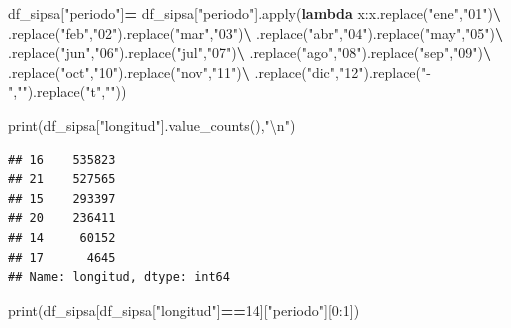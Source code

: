 \documentclass[
]{book}
\newenvironment{Shaded}{\begin{snugshade}}{\end{snugshade}}
\newcommand{\BuiltInTok}[1]{#1}
\newcommand{\CharTok}[1]{\textcolor[rgb]{0.31,0.60,0.02}{#1}}
\newcommand{\DecValTok}[1]{\textcolor[rgb]{0.00,0.00,0.81}{#1}}
\newcommand{\KeywordTok}[1]{\textcolor[rgb]{0.13,0.29,0.53}{\textbf{#1}}}
\newcommand{\NormalTok}[1]{#1}
\newcommand{\OperatorTok}[1]{\textcolor[rgb]{0.81,0.36,0.00}{\textbf{#1}}}
\newcommand{\StringTok}[1]{\textcolor[rgb]{0.31,0.60,0.02}{#1}}
\begin{document}
\begin{Shaded}
\begin{Highlighting}[]

\NormalTok{df\_sipsa[}\StringTok{"periodo"}\NormalTok{]}\OperatorTok{=}\NormalTok{ df\_sipsa[}\StringTok{"periodo"}\NormalTok{].}\BuiltInTok{apply}\NormalTok{(}\KeywordTok{lambda}\NormalTok{ x:x.replace(}\StringTok{"ene"}\NormalTok{,}\StringTok{"01"}\NormalTok{)}\OperatorTok{\textbackslash{}}
\NormalTok{                                              .replace(}\StringTok{"feb"}\NormalTok{,}\StringTok{"02"}\NormalTok{).replace(}\StringTok{"mar"}\NormalTok{,}\StringTok{"03"}\NormalTok{)}\OperatorTok{\textbackslash{}}
\NormalTok{                                              .replace(}\StringTok{"abr"}\NormalTok{,}\StringTok{"04"}\NormalTok{).replace(}\StringTok{"may"}\NormalTok{,}\StringTok{"05"}\NormalTok{)}\OperatorTok{\textbackslash{}}
\NormalTok{                                              .replace(}\StringTok{"jun"}\NormalTok{,}\StringTok{"06"}\NormalTok{).replace(}\StringTok{"jul"}\NormalTok{,}\StringTok{"07"}\NormalTok{)}\OperatorTok{\textbackslash{}}
\NormalTok{                                              .replace(}\StringTok{"ago"}\NormalTok{,}\StringTok{"08"}\NormalTok{).replace(}\StringTok{"sep"}\NormalTok{,}\StringTok{"09"}\NormalTok{)}\OperatorTok{\textbackslash{}}
\NormalTok{                                              .replace(}\StringTok{"oct"}\NormalTok{,}\StringTok{"10"}\NormalTok{).replace(}\StringTok{"nov"}\NormalTok{,}\StringTok{"11"}\NormalTok{)}\OperatorTok{\textbackslash{}}
\NormalTok{                                              .replace(}\StringTok{"dic"}\NormalTok{,}\StringTok{"12"}\NormalTok{).replace(}\StringTok{"{-}"}\NormalTok{,}\StringTok{""}\NormalTok{).replace(}\StringTok{"t"}\NormalTok{,}\StringTok{""}\NormalTok{))}

\BuiltInTok{print}\NormalTok{(df\_sipsa[}\StringTok{"longitud"}\NormalTok{].value\_counts(),}\StringTok{"}\CharTok{\textbackslash{}n}\StringTok{"}\NormalTok{)}
\end{Highlighting}
\end{Shaded}

\begin{verbatim}
## 16    535823
## 21    527565
## 15    293397
## 20    236411
## 14     60152
## 17      4645
## Name: longitud, dtype: int64
\end{verbatim}

\begin{Shaded}
\begin{Highlighting}[]
\BuiltInTok{print}\NormalTok{(df\_sipsa[df\_sipsa[}\StringTok{"longitud"}\NormalTok{]}\OperatorTok{==}\DecValTok{14}\NormalTok{][}\StringTok{"periodo"}\NormalTok{][}\DecValTok{0}\NormalTok{:}\DecValTok{1}\NormalTok{])}
\end{Highlighting}
\end{Shaded}
\end{document}
